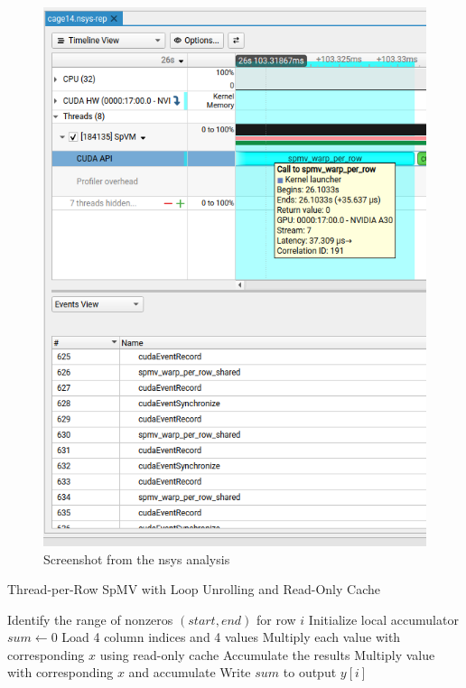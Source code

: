 \documentclass[conference]{IEEEtran}
\begin{document}
\begin{figure}[ht]
    \centering
    \includegraphics[width=0.95\linewidth]{nsys.png}
    \caption{Screenshot from the nsys analysis}
    \label{fig:spvmexample}
\end{figure}

\begin{algorithm*}[ht]
    \caption{Thread-per-Row SpMV with Loop Unrolling and Read-Only Cache}
    \begin{algorithmic}[1]
            \State Identify the range of nonzeros $(start, end)$ for row $i$
            \State Initialize local accumulator $sum \gets 0$
                \State Load 4 column indices and 4 values
                \State Multiply each value with corresponding $x$ using read-only cache
                \State Accumulate the results
            \EndFor
                \State Multiply value with corresponding $x$ and accumulate
            \EndFor
            \State Write $sum$ to output $y[i]$
        \EndFor
    \EndProcedure
    \end{algorithmic}
\end{algorithm*}
\end{document}
